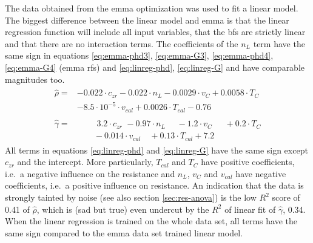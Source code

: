The data obtained from the \gls{emma} optimization was used to fit a linear model. 
The biggest difference between the linear model and \gls{emma} is that the linear regression function will include all input variables, that the \gls{bf}s are strictly linear and that there are no interaction terms. 
The coefficients of the $n_L$ term have the same sign in equations \ref{eq:emma-phd3}, \ref{eq:emma-G3}, \ref{eq:emma-phd4}, \ref{eq:emma-G4} (\gls{emma} \gls{rf}s) and \ref{eq:linreg-phd}, \ref{eq:linreg-G} and have comparable magnitudes too. 
%
%
\begin{align}
	\begin{split}
		\label{eq:linreg-phd}
		\hat{\rho} =&  -0.022\cdot c_{zr} -0.022\cdot n_L -0.0029\cdot v_{C} + 0.0058\cdot T_{C} \\
		& -8.5\cdot 10^{-5}\cdot v_{cal} + 0.0026\cdot T_{cal} -0.76
	\end{split}
	\\
	\begin{split}
		\label{eq:linreg-G}
		\hat{\gamma} =&  \,\,\qquad 3.2\cdot c_{zr} \,\, - 0.97\cdot n_L \,\,\quad - 1.2\cdot v_{C}  \,\,\,\quad +0.2\cdot T_{C} \\
			& \qquad - 0.014\cdot v_{cal} \quad + 0.13\cdot T_{cal} + 7.2
	\end{split}
\end{align}
%
All terms in equations \ref{eq:linreg-phd} and \ref{eq:linreg-G} have the same sign 
except $c_{zr}$ and the intercept. 
%
More particularly, $T_{cal}$ and $T_{C}$ have positive coefficients, i.e.\ a negative influence on the resistance 
and $n_L$, $v_{C}$ and $v_{cal}$ have negative coefficients, i.e.\ a positive influence on resistance. 
An indication that the data is strongly tainted by noise (see also section \ref{sec:res-anova}) is the low $R^2$ score of 0.41 of $\hat\rho$, 
which is (sad but true) even undercut by the $R^2$ of linear fit of $\hat\gamma$, 0.34. 
When the linear regression is trained on the whole data set, all terms have the same sign compared to the \gls{emma} data set trained linear model. 
